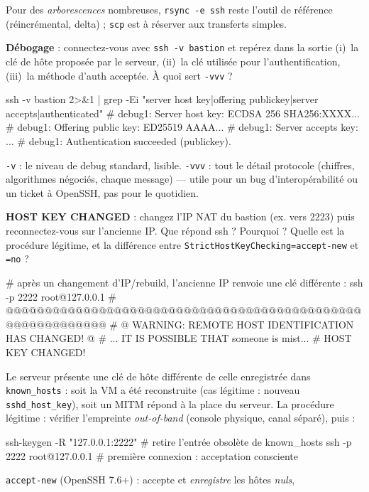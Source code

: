 \documentclass[a4paper,10pt]{exam}
\begin{document}
\begin{questions}
\begin{solution}
Pour des \emph{arborescences} nombreuses, \texttt{rsync -e ssh} reste l'outil de
référence (réincrémental, delta) ; \texttt{scp} est à réserver aux transferts simples.
\end{solution}
\question \textbf{Débogage} : connectez-vous avec \texttt{ssh -v bastion} et repérez dans
la sortie (i)~la clé de hôte proposée par le serveur, (ii)~la clé utilisée pour
l'authentification, (iii)~la méthode d'auth acceptée. À quoi sert \texttt{-vvv} ?
\begin{solution}
\begin{bashcode}
ssh -v bastion 2>&1 | grep -Ei "server host key|offering publickey|server accepts|authenticated"
# debug1: Server host key: ECDSA 256 SHA256:XXXX...
# debug1: Offering public key: ED25519 AAAA...
# debug1: Server accepts key: ...
# debug1: Authentication succeeded (publickey).
\end{bashcode}
\texttt{-v} : le niveau de debug standard, lisible. \texttt{-vvv} : tout le détail
protocole (chiffres, algorithmes négociés, chaque message) — utile pour un bug
d'interopérabilité ou un ticket à OpenSSH, pas pour le quotidien.
\end{solution}
\question \textbf{HOST KEY CHANGED} : changez l'IP NAT du bastion (ex. vers 2223) puis
reconnectez-vous sur l'ancienne IP. Que répond ssh ? Pourquoi ? Quelle est la procédure
légitime, et la différence entre \texttt{StrictHostKeyChecking=accept-new} et
\texttt{=no} ?
\begin{solution}
\begin{bashcode}
# après un changement d'IP/rebuild, l'ancienne IP renvoie une clé différente :
ssh -p 2222 root@127.0.0.1
# @@@@@@@@@@@@@@@@@@@@@@@@@@@@@@@@@@@@@@@@@@@@@@@@@@@@@@@@@@@
# @    WARNING: REMOTE HOST IDENTIFICATION HAS CHANGED!     @
# ... IT IS POSSIBLE THAT someone is mist...
# HOST KEY CHANGED!
\end{bashcode}
Le serveur présente une clé de hôte différente de celle enregistrée dans
\texttt{known\_hosts} : soit la VM a été reconstruite (cas légitime : nouveau
\texttt{sshd\_host\_key}), soit un MITM répond à la place du serveur. La procédure
légitime : vérifier l'empreinte \emph{out-of-band} (console physique, canal séparé),
puis :
\begin{bashcode}
ssh-keygen -R "127.0.0.1:2222"   # retire l'entrée obsolète de known_hosts
ssh -p 2222 root@127.0.0.1       # première connexion : acceptation consciente
\end{bashcode}
\texttt{accept-new} (OpenSSH 7.6+) : accepte et \emph{enregistre} les hôtes \emph{nuls},

\end{solution}
\end{questions}
\end{document}
